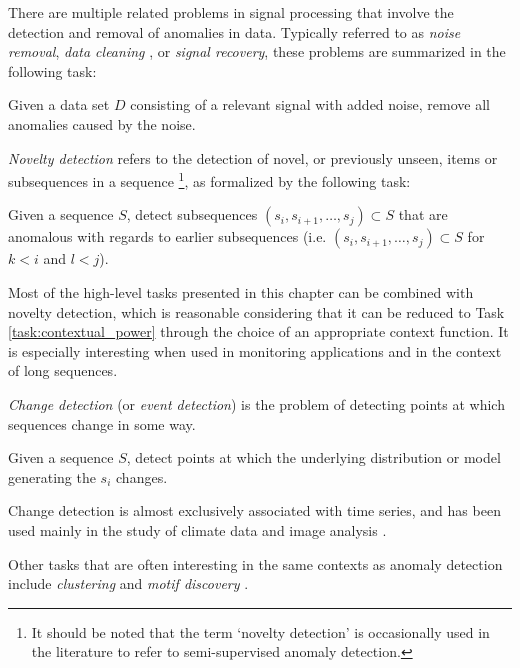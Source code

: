 There are multiple related problems in signal processing that involve the detection and removal of anomalies in data. Typically referred to as \emph{noise removal}, \emph{data cleaning} \cite{meckesheimer}, or \emph{signal recovery}, these problems are summarized in the following task:
\begin{task}
  Given a data set $D$ consisting of a relevant signal with added noise, remove all anomalies caused by the noise.
\end{task}

\emph{Novelty detection} \cite{chandola} refers to the detection of novel, or previously unseen, items or subsequences in a sequence \footnote{It should be noted that the term `novelty detection' is occasionally used in the literature to refer to semi-supervised anomaly detection.}, as formalized by the following task:
\begin{task}
  \label{task:novelty_detection}
  Given a sequence $S$, detect subsequences $(s_i, s_{i+1}, \dots, s_j) \subset S$ that are anomalous with regards to earlier subsequences (i.e. $(s_i, s_{i+1}, \dots, s_j) \subset S$ for $k < i$ and $l < j$).
\end{task}
Most of the high-level tasks presented in this chapter can be combined with novelty detection, which is reasonable considering that it can be reduced to Task \ref{task:contextual_power} through the choice of an appropriate context function. It is especially interesting when used in monitoring applications and in the context of long sequences.

\emph{Change detection} (or \emph{event detection}) is the problem of detecting points at which sequences change in some way.
\begin{task}
      Given a sequence $S$, detect points at which the underlying distribution or model generating the $s_i$ changes.
\end{task}
Change detection is almost exclusively associated with time series, and has been used mainly in the study of climate data \cite{gopala} and image analysis \cite{radke}.

Other tasks that are often interesting in the same contexts as anomaly detection include \emph{clustering} \cite{clustering} and \emph{motif discovery} \cite{motif} \cite{motif2}.

